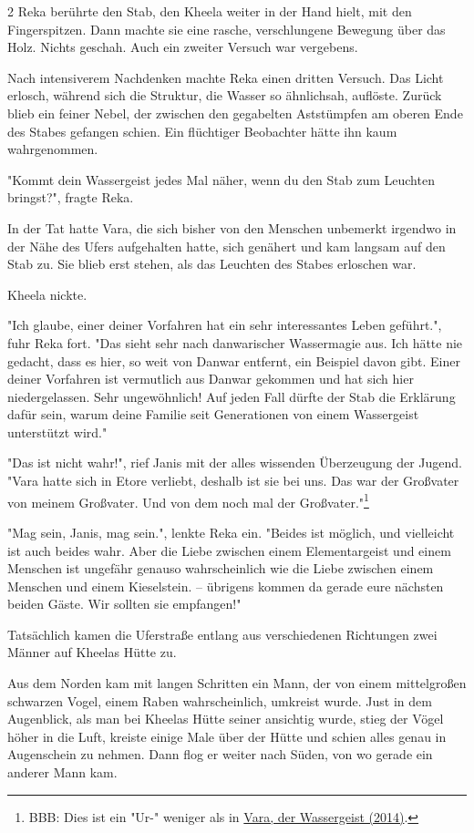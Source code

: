 \documentclass[10pt, a4paper, oneside]{book}
\begin{document}
\begin{multicols}{2}
Reka berührte den Stab, den Kheela weiter in der Hand hielt, mit den Fingerspitzen. Dann machte sie eine rasche, verschlungene Bewegung über das Holz. Nichts geschah. Auch ein zweiter Versuch war vergebens. 

Nach intensiverem Nachdenken machte Reka einen dritten Versuch. Das Licht erlosch, während sich die Struktur, die Wasser so ähnlichsah, auflöste. Zurück blieb ein feiner Nebel, der zwischen den gegabelten Aststümpfen am oberen Ende des Stabes gefangen schien. Ein flüchtiger Beobachter hätte ihn kaum wahrgenommen. 

"Kommt dein Wassergeist jedes Mal näher, wenn du den Stab zum Leuchten bringst?", fragte Reka. 

In der Tat hatte Vara, die sich bisher von den Menschen unbemerkt irgendwo in der Nähe des Ufers aufgehalten hatte, sich genähert und kam langsam auf den Stab zu. Sie blieb erst stehen, als das Leuchten des Stabes erloschen war. 

Kheela nickte. 

"Ich glaube, einer deiner Vorfahren hat ein sehr interessantes Leben geführt.", fuhr Reka fort. "Das sieht sehr nach danwarischer Wassermagie aus. Ich hätte nie gedacht, dass es hier, so weit von Danwar entfernt, ein Beispiel davon gibt. Einer deiner Vorfahren ist vermutlich aus Danwar gekommen und hat sich hier niedergelassen. Sehr ungewöhnlich! Auf jeden Fall dürfte der Stab die Erklärung dafür sein, warum deine Familie seit Generationen von einem Wassergeist unterstützt wird." 

"Das ist nicht wahr!", rief Janis mit der alles wissenden Überzeugung der Jugend. "Vara hatte sich in Etore verliebt, deshalb ist sie bei uns. Das war der Großvater von meinem Großvater. Und von dem noch mal der Großvater."\footnote{BBB: Dies ist ein "Ur-" weniger als in \hyperref[storytext-2014-vara-der-wassergeist]{Vara, der Wassergeist (2014)}.} 

"Mag sein, Janis, mag sein.", lenkte Reka ein. "Beides ist möglich, und vielleicht ist auch beides wahr. Aber die Liebe zwischen einem Elementargeist und einem Menschen ist ungefähr genauso wahrscheinlich wie die Liebe zwischen einem Menschen und einem Kieselstein. – übrigens kommen da gerade eure nächsten beiden Gäste. Wir sollten sie empfangen!" 

Tatsächlich kamen die Uferstraße entlang aus verschiedenen Richtungen zwei Männer auf Kheelas Hütte zu. 

Aus dem Norden kam mit langen Schritten ein Mann, der von einem mittelgroßen schwarzen Vogel, einem Raben wahrscheinlich, umkreist wurde. Just in dem Augenblick, als man bei Kheelas Hütte seiner ansichtig wurde, stieg der Vögel höher in die Luft, kreiste einige Male über der Hütte und schien alles genau in Augenschein zu nehmen. Dann flog er weiter nach Süden, von wo gerade ein anderer Mann kam. 


\end{multicols}
\end{document}
